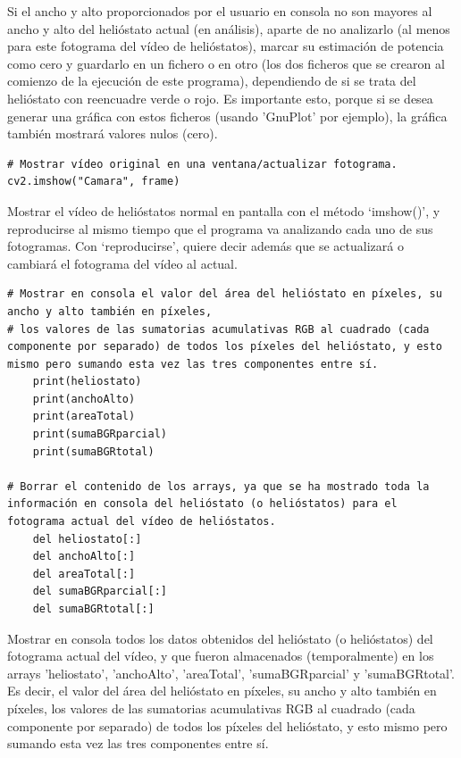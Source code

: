 Si el ancho y alto proporcionados por el usuario en consola no son mayores al ancho y alto del helióstato actual (en análisis), aparte de no analizarlo (al menos para este fotograma del vídeo de helióstatos), marcar su estimación de potencia como cero y guardarlo en un fichero o en otro (los dos ficheros que se crearon al comienzo de la ejecución de este programa), dependiendo de si se trata del helióstato con reencuadre verde o rojo. Es importante esto, porque si se desea generar una gráfica con estos ficheros (usando 'GnuPlot' por ejemplo), la gráfica también mostrará valores nulos (cero).\\[20pt]

\begin{lstlisting}
# Mostrar vídeo original en una ventana/actualizar fotograma.
cv2.imshow("Camara", frame)
\end{lstlisting}

Mostrar el vídeo de helióstatos normal en pantalla con el método ‘imshow()’, y reproducirse al mismo tiempo que el programa va analizando cada uno de sus fotogramas. Con ‘reproducirse’, quiere decir además que se actualizará o cambiará el fotograma del vídeo al actual.\\[20pt]

\begin{lstlisting}
# Mostrar en consola el valor del área del helióstato en píxeles, su ancho y alto también en píxeles,
# los valores de las sumatorias acumulativas RGB al cuadrado (cada componente por separado) de todos los píxeles del helióstato, y esto mismo pero sumando esta vez las tres componentes entre sí.
    print(heliostato)
    print(anchoAlto)
    print(areaTotal)
    print(sumaBGRparcial)
    print(sumaBGRtotal)

# Borrar el contenido de los arrays, ya que se ha mostrado toda la información en consola del helióstato (o helióstatos) para el fotograma actual del vídeo de helióstatos.
    del heliostato[:]
    del anchoAlto[:]
    del areaTotal[:]
    del sumaBGRparcial[:]
    del sumaBGRtotal[:]
\end{lstlisting}
    
Mostrar en consola todos los datos obtenidos del helióstato (o helióstatos) del fotograma actual del vídeo, y que fueron almacenados (temporalmente) en los arrays 'heliostato', 'anchoAlto', 'areaTotal', 'sumaBGRparcial' y 'sumaBGRtotal'. Es decir, el valor del área del helióstato en píxeles, su ancho y alto también en píxeles, los valores de las sumatorias acumulativas RGB al cuadrado (cada componente por separado) de todos los píxeles del helióstato, y esto mismo pero sumando esta vez las tres componentes entre sí.

